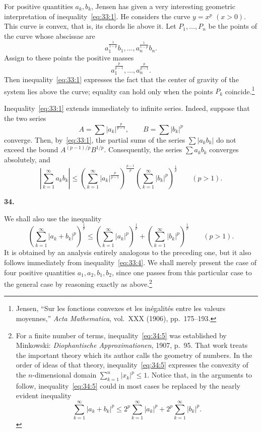 \documentclass[
  paper=b5,
  fontsize=13pt,
  twoside=true,
  open=any,
  bookmarkpackage=false,
  chapterprefix=true,
  headings=normal
]{scrbook}
\theoremstyle{definition}
\newcommand{\numberedparagraph}[1]{%
  \par\medskip\phantomsection\label{sec:#1}%
  \noindent\textbf{#1.}\enspace
}
\begin{document}
For positive quantities $a_k,b_k$, Jensen has given a very interesting geometric interpretation of inequality~\eqref{eq:33:1}. He considers the curve $y=x^p$ $(x>0)$. This curve is convex, that is, its chords lie above it. Let $P_1,\ldots,P_n$ be the points of the curve whose abscissae are
\[
 a_1^{\frac1{1-p}}b_1,\ldots,a_n^{\frac1{1-p}}b_n.
\]
Assign to these points the positive masses
\[
 a_1^{\frac{p}{p-1}},\ldots,a_n^{\frac{p}{p-1}}.
\]
Then inequality~\eqref{eq:33:1} expresses the fact that the center of gravity of the system lies above the curve; equality can hold only when the points $P_k$ coincide.\footnote{Jensen, ``Sur les fonctions convexes et les in\'egalit\'es entre les valeurs moyennes,'' \emph{Acta Mathematica}, vol.~XXX (1906), pp.~175--193.}

Inequality~\eqref{eq:33:1} extends immediately to infinite series. Indeed, suppose that the two series
\[
 A=\sum|a_k|^{\frac{p}{p-1}},
 \qquad B=\sum|b_k|^p
\]
converge. Then, by~\eqref{eq:33:1}, the partial sums of the series $\sum|a_kb_k|$ do not exceed the bound $A^{(p-1)/p}B^{1/p}$. Consequently,
the series $\sum a_kb_k$ converges absolutely, and
\begin{equation}
 \left|\sum_{k=1}^{\infty}a_kb_k\right|
 \leq
 \left(\sum_{k=1}^{\infty}|a_k|^{\frac{p}{p-1}}\right)^{\frac{p-1}{p}}
 \left(\sum_{k=1}^{\infty}|b_k|^p\right)^{\frac1p}
 \qquad(p>1).
 \tag{4}\label{eq:33:4}
\end{equation}

\numberedparagraph{34}
We shall also use the inequality
\begin{equation}
 \left(\sum_{k=1}^{\infty}|a_k+b_k|^p\right)^{\frac1p}
 \leq
 \left(\sum_{k=1}^{\infty}|a_k|^p\right)^{\frac1p}
 +\left(\sum_{k=1}^{\infty}|b_k|^p\right)^{\frac1p}
 \qquad(p>1).
 \tag{5}\label{eq:34:5}
\end{equation}
It is obtained by an analysis entirely analogous to the preceding one, but it also follows immediately from inequality~\eqref{eq:33:4}. We shall merely present the case of four positive quantities $a_1,a_2,b_1,b_2$, since one passes from this particular case to the general case by reasoning exactly as above.\footnote{For a finite number of terms, inequality~\eqref{eq:34:5} was established by Minkowski: \emph{Diophantische Approximationen}, 1907, p.~95. That work treats the important theory which its author calls the geometry of numbers. In the order of ideas of that theory, inequality~\eqref{eq:34:5} expresses the convexity of the $n$-dimensional domain $\sum_{k=1}^{n}|x_k|^p\leq1$. Notice that, in the arguments to follow, inequality~\eqref{eq:34:5} could in most cases be replaced by the nearly evident inequality
\[
 \sum_{k=1}^{\infty}|a_k+b_k|^p
 \leq2^p\sum_{k=1}^{\infty}|a_k|^p
      +2^p\sum_{k=1}^{\infty}|b_k|^p.
\]}
\end{document}
